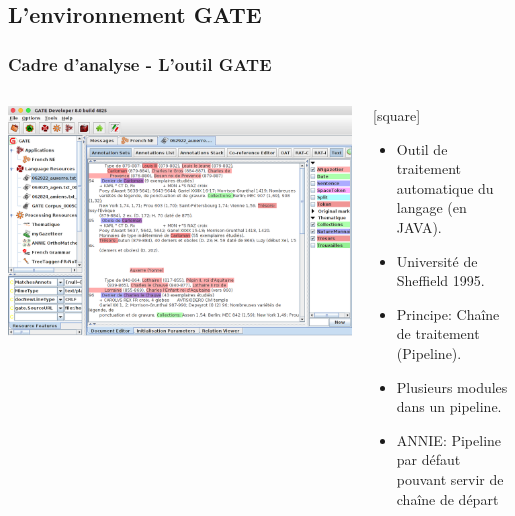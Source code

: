 \documentclass[10pt, compress]{beamer}
\begin{document}
\subsection{L'environnement GATE}
\begin{frame}[fragile]
\frametitle{Cadre d'analyse - L'outil GATE}
\begin{columns}
	\includegraphics[scale=0.190]{img/gatePresent.png} 
	\onslide<1>
	\begin{scriptsize}
		[square]
	\begin{itemize}
		\item{Outil de traitement automatique du langage (en JAVA).}
		\item{Université de Sheffield 1995.}
		\item{Principe: Chaîne de traitement (Pipeline).}
		\item{Plusieurs modules dans un pipeline.}
		\item{ANNIE: Pipeline par défaut pouvant servir de chaîne de départ}
	\end{itemize}
	\end{scriptsize}
\end{columns}
\end{frame}
\end{document}
